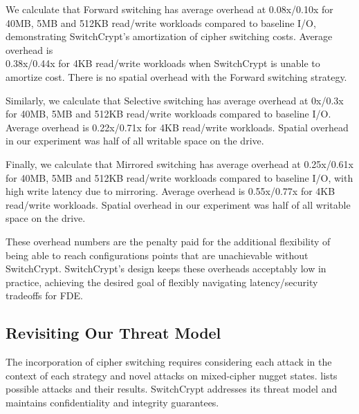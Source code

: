 We calculate that Forward switching has average overhead at 0.08x/0.10x for
40MB, 5MB and 512KB read/write workloads compared to baseline I/O, demonstrating
SwitchCrypt's amortization of cipher switching costs. Average overhead
is\\0.38x/0.44x for 4KB read/write workloads when SwitchCrypt is unable to
amortize cost. There is no spatial overhead with the Forward switching strategy.

Similarly, we calculate that Selective switching has average overhead at 0x/0.3x
for 40MB, 5MB and 512KB read/write workloads compared to baseline I/O. Average
overhead is 0.22x/0.71x for 4KB read/write workloads. Spatial overhead in our
experiment was half of all writable space on the drive.

Finally, we calculate that Mirrored switching has average overhead at
0.25x/0.61x for 40MB, 5MB and 512KB read/write workloads compared to baseline
I/O, with high write latency due to mirroring. Average overhead is 0.55x/0.77x
for 4KB read/write workloads. Spatial overhead in our experiment was half of all
writable space on the drive.

These overhead numbers are the penalty paid for the additional flexibility of
being able to reach configurations points that are unachievable without
SwitchCrypt. SwitchCrypt's design keeps these overheads acceptably low in
practice, achieving the desired goal of flexibly navigating latency/security
tradeoffs for FDE.

\subsection{Revisiting Our Threat Model} \label{subsec:4}

The incorporation of cipher switching requires considering each attack in the
context of each strategy and novel attacks on mixed-cipher nugget states.
 lists possible attacks and their results. SwitchCrypt
addresses its threat model and maintains confidentiality and integrity
guarantees.


